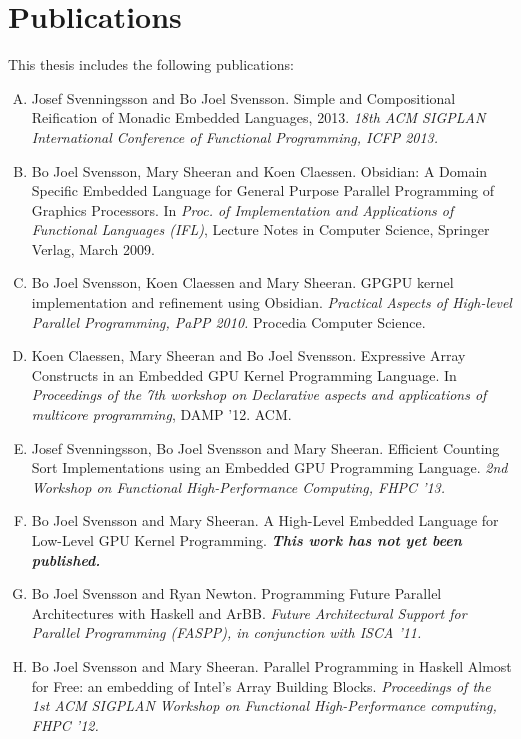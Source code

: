 \documentclass[a4paper]{book}
\begin{document}
\clearpage

\section*{Publications}

This thesis includes the following publications: 

\begin{enumerate}[A.] 
\item Josef Svenningsson and Bo Joel Svensson. Simple and Compositional Reification of Monadic Embedded Languages, 2013. \emph{18th ACM SIGPLAN International Conference of Functional Programming, ICFP 2013.}
\item Bo Joel Svensson, Mary Sheeran and Koen Claessen. Obsidian: A Domain Specific Embedded Language for General Purpose Parallel Programming of Graphics Processors. In \emph{Proc. of Implementation and Applications of Functional Languages (IFL)}, Lecture Notes in Computer Science, Springer Verlag, March 2009.
\item Bo Joel Svensson, Koen Claessen and Mary Sheeran. GPGPU kernel implementation and refinement using Obsidian. \emph{Practical Aspects of High-level Parallel Programming, PaPP 2010.} Procedia Computer Science.
\item Koen Claessen, Mary Sheeran and Bo Joel Svensson. Expressive Array Constructs in an Embedded GPU Kernel Programming Language. In \emph{Proceedings of the 7th workshop on Declarative aspects and applications of multicore programming}, DAMP '12. ACM. 
\item Josef Svenningsson, Bo Joel Svensson and Mary Sheeran. Efficient Counting Sort Implementations using an Embedded GPU Programming Language. \emph{2nd Workshop on Functional High-Performance Computing, FHPC '13.}
\item Bo Joel Svensson and Mary Sheeran. A High-Level Embedded Language for Low-Level GPU Kernel Programming. {\bf\emph{This work has not yet been published.}} 
\item Bo Joel Svensson and Ryan Newton. Programming Future Parallel Architectures with Haskell and ArBB. \emph{Future Architectural Support for Parallel Programming (FASPP), in conjunction with ISCA '11.}
\item Bo Joel Svensson and Mary Sheeran. Parallel Programming in Haskell Almost for Free: an embedding of Intel's Array Building Blocks. \emph{Proceedings of the 1st ACM SIGPLAN Workshop on Functional High-Performance computing, FHPC '12.}
\end{enumerate} 
\end{document}
